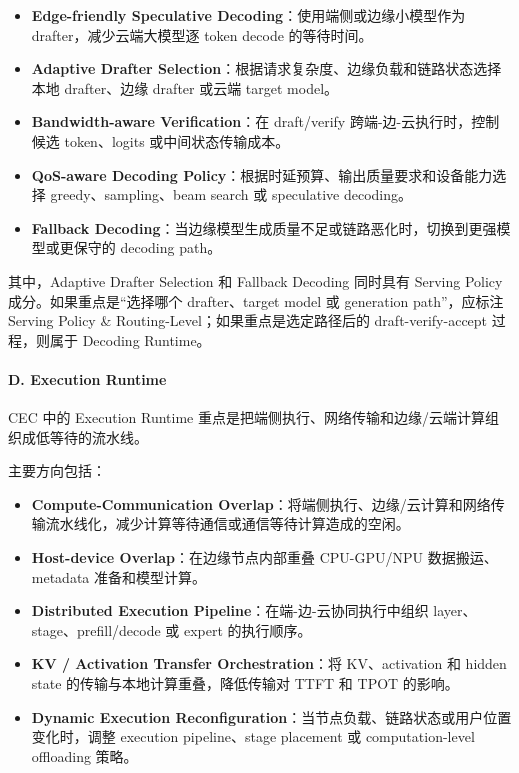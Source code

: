 \documentclass[a4paper,10pt]{ctexart}
\begin{document}
\begin{itemize}
\item \textbf{Edge-friendly Speculative Decoding}：使用端侧或边缘小模型作为 drafter，减少云端大模型逐 token decode 的等待时间。

\item \textbf{Adaptive Drafter Selection}：根据请求复杂度、边缘负载和链路状态选择本地 drafter、边缘 drafter 或云端 target model。

\item \textbf{Bandwidth-aware Verification}：在 draft/verify 跨端-边-云执行时，控制候选 token、logits 或中间状态传输成本。

\item \textbf{QoS-aware Decoding Policy}：根据时延预算、输出质量要求和设备能力选择 greedy、sampling、beam search 或 speculative decoding。

\item \textbf{Fallback Decoding}：当边缘模型生成质量不足或链路恶化时，切换到更强模型或更保守的 decoding path。



\end{itemize}
其中，Adaptive Drafter Selection 和 Fallback Decoding 同时具有 Serving Policy 成分。如果重点是“选择哪个 drafter、target model 或 generation path”，应标注 Serving Policy \& Routing-Level；如果重点是选定路径后的 draft-verify-accept 过程，则属于 Decoding Runtime。




\paragraph*{D. Execution Runtime}



CEC 中的 Execution Runtime 重点是把端侧执行、网络传输和边缘/云端计算组织成低等待的流水线。




主要方向包括：




\begin{itemize}
\item \textbf{Compute-Communication Overlap}：将端侧执行、边缘/云计算和网络传输流水线化，减少计算等待通信或通信等待计算造成的空闲。

\item \textbf{Host-device Overlap}：在边缘节点内部重叠 CPU-GPU/NPU 数据搬运、metadata 准备和模型计算。

\item \textbf{Distributed Execution Pipeline}：在端-边-云协同执行中组织 layer、stage、prefill/decode 或 expert 的执行顺序。

\item \textbf{KV / Activation Transfer Orchestration}：将 KV、activation 和 hidden state 的传输与本地计算重叠，降低传输对 TTFT 和 TPOT 的影响。

\item \textbf{Dynamic Execution Reconfiguration}：当节点负载、链路状态或用户位置变化时，调整 execution pipeline、stage placement 或 computation-level offloading 策略。



\end{itemize}
\end{document}
